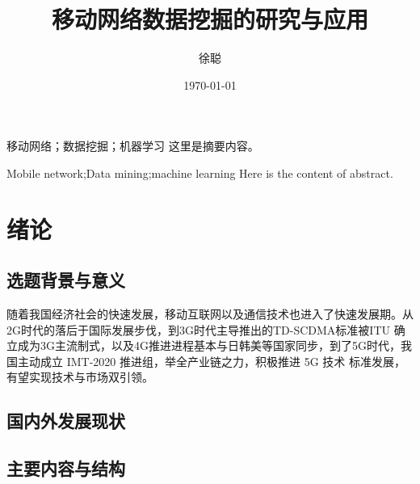 \documentclass{HustGraduPaper}
\title{移动网络数据挖掘的研究与应用}
\author{徐聪}
\date{\today}
\begin{document}
    \maketitle
    \statement
    \clearpage

    \begin{cnabstract}{移动网络；数据挖掘；机器学习}
        这里是摘要内容。
    \end{cnabstract}
    \begin{enabstract}{Mobile network;Data mining;machine learning}
        Here is the content of abstract.
    \end{enabstract}

    \tableofcontents
    \clearpage

    \section{绪论}
    \subsection{选题背景与意义}
    随着我国经济社会的快速发展，移动互联网以及通信技术也进入了快速发展期。从2G时代的落后于国际发展步伐，到3G时代主导推出的TD-SCDMA标准被ITU
    确立成为3G主流制式，以及4G推进进程基本与日韩美等国家同步，到了5G时代，我国主动成立 IMT-2020 推进组，举全产业链之力，积极推进 5G 技术
    标准发展，有望实现技术与市场双引领。
    \subsection{国内外发展现状}
    \subsection{主要内容与结构}
    
    
\end{document}
